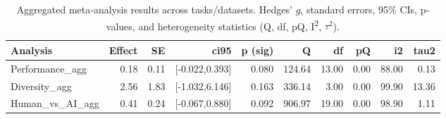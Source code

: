 \begin{table}[ht]
\centering
\begin{tabular}{lrrrrrrrrr}
  \toprule
Analysis & Effect & SE & ci95 & p (sig) & Q & df & pQ & i2 & tau2 \\ 
  \midrule
Performance_agg & 0.18 & 0.11 & [-0.022,0.393] & 0.080 & 124.64 & 13.00 & 0.00 & 88.00 & 0.13 \\ 
  Diversity_agg & 2.56 & 1.83 & [-1.032,6.146] & 0.163 & 336.14 & 3.00 & 0.00 & 99.90 & 13.36 \\ 
  Human_vs_AI_agg & 0.41 & 0.24 & [-0.067,0.880] & 0.092 & 906.97 & 19.00 & 0.00 & 98.90 & 1.11 \\ 
   \bottomrule
\end{tabular}
\caption{Aggregated meta‐analysis results across tasks/datasets. Hedges’ $g$, standard errors, 95\% CIs, p‐values, and heterogeneity statistics (Q, df, pQ, I\textsuperscript{2}, $\tau^2$).} 
\label{tab:meta_agg}
\end{table}
